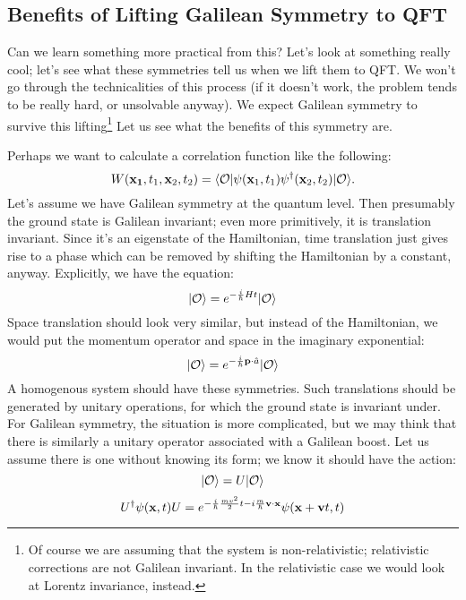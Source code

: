 \subsection{Benefits of Lifting Galilean Symmetry to QFT}
Can we learn something more practical from this? Let's look at something really cool; let's see what these symmetries tell us when we lift them to QFT. We won't go through the technicalities of this process (if it doesn't work, the problem tends to be really hard, or unsolvable anyway). We expect Galilean symmetry to survive this lifting\footnote{Of course we are assuming that the system is non-relativistic; relativistic corrections are not Galilean invariant. In the relativistic case we would look at Lorentz invariance, instead.} Let us see what the benefits of this symmetry are.

Perhaps we want to calculate a correlation function like the following:
\begin{equation}
    W(\mathbf{x_1}, t_1, \mathbf{x}_2, t_2) = \langle \mathcal{O} \rvert\psi(\mathbf{x}_1, t_1)\psi^\dagger(\mathbf{x}_2, t_2)\lvert \mathcal{O} \rangle.
\end{equation}
Let's assume we have Galilean symmetry at the quantum level. Then presumably the ground state is Galilean invariant; even more primitively, it is translation invariant. Since it's an eigenstate of the Hamiltonian, time translation just gives rise to a phase which can be removed by shifting the Hamiltonian by a constant, anyway. Explicitly, we have the equation:
\begin{equation}
    \lvert \mathcal{O} \rangle = e^{-\frac{i}{\hbar}Ht}\lvert \mathcal{O} \rangle
\end{equation}
Space translation should look very similar, but instead of the Hamiltonian, we would put the momentum operator and space in the imaginary exponential:
\begin{equation}
    \lvert \mathcal{O} \rangle = e^{-\frac{i}{\hbar}\mathbf{p}\cdot\hat{a}}\lvert \mathcal{O} \rangle
\end{equation}
A homogenous system should have these symmetries. Such translations should be generated by unitary operations, for which the ground state is invariant under. For Galilean symmetry, the situation is more complicated, but we may think that there is similarly a unitary operator associated with a Galilean boost. Let us assume there is one without knowing its form; we know it should have the action:
\begin{equation}
    \lvert \mathcal{O} \rangle = U\lvert \mathcal{O} \rangle
\end{equation}
\begin{equation}
    U^\dagger \psi(\mathbf{x}, t)U = e^{-\frac{i}{\hbar}\frac{mv^2}{2}t - i\frac{m}{\hbar}\mathbf{v}\cdot\mathbf{x}}\psi(\mathbf{x} + \mathbf{v}t, t)
\end{equation}
